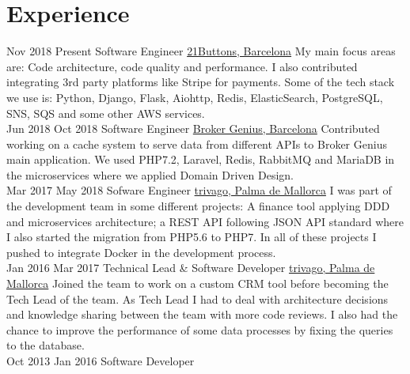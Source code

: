 \documentclass[letterpaper]{twentysecondcv} %
\begin{document}
\makeprofile %



\section{Experience}

\begin{twenty} %
\twentyitem
	{Nov 2018}
	{Present}
	{Software Engineer}
	{\href{https://www.21buttons.com}{21Buttons, Barcelona}}
	{My main focus areas are: Code architecture, code quality and performance. I also contributed integrating 3rd party platforms like Stripe for payments.
        Some of the tech stack we use is: Python, Django, Flask, Aiohttp, Redis, ElasticSearch, PostgreSQL, SNS, SQS and some other AWS services.}
	\\
\twentyitem
	{Jun 2018}
	{Oct 2018}
	{Software Engineer}
	{\href{https://brokergenius.com}{Broker Genius, Barcelona}}
	{Contributed working on a cache system to serve data from different APIs to Broker Genius main application. We used PHP7.2, Laravel, Redis, RabbitMQ and MariaDB in the microservices where we applied Domain Driven Design.}
	\\
\twentyitem
    	{Mar 2017}
	{May 2018}
        {Sofware Engineer}
        {\href{https://www.trivago.com}{trivago, Palma de Mallorca}}
	{I was part of the development team in some different projects: A finance tool applying DDD and microservices architecture; a REST API following JSON API standard where I also started the migration from PHP5.6 to PHP7. In all of these projects I pushed to integrate Docker in the development process.}
        \\
\twentyitem
    	{Jan 2016}
	{Mar 2017}
        {Technical Lead \& Software Developer}
        {\href{https://www.trivago.com}{trivago, Palma de Mallorca}}
	{Joined the team to work on a custom CRM tool before becoming the Tech Lead of the team. As Tech Lead I had to deal with architecture decisions and knowledge sharing between the team with more code reviews. I also had the chance to improve the performance of some data processes by fixing the queries to the database.}
        \\
\twentyitem
   	{Oct 2013}
	{Jan 2016}
        {Software Developer}

\end{twenty}
\end{document}
